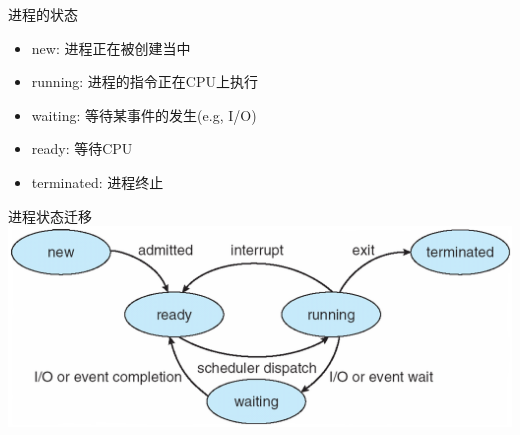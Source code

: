 \documentclass[xcolor=svgnames]{beamer}
\begin{document}
\begin{CJK*}{UTF8}{gbsn}
\begin{frame}{进程的状态}
\begin{itemize}
\item new: 进程正在被创建当中
\item running: 进程的指令正在CPU上执行
\item waiting: 等待某事件的发生(e.g, I/O)
\item ready: 等待CPU
\item terminated: 进程终止
\end{itemize}
\end{frame}

\begin{frame}{进程状态迁移}
\includegraphics[width=1.0\textwidth]{state.png}
\end{frame}


\end{CJK*}
\end{document}
